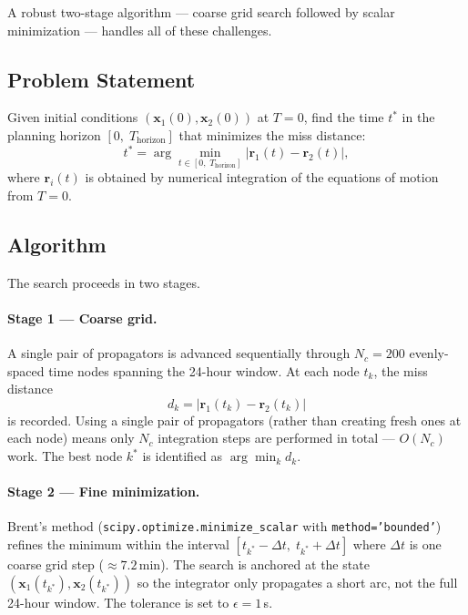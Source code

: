 \documentclass[11pt]{article}
\begin{document}
A robust two-stage algorithm — coarse grid search followed by scalar minimization
— handles all of these challenges.

\subsection{Problem Statement}

Given initial conditions $(\mathbf{x}_1(0), \mathbf{x}_2(0))$ at $T{=}0$,
find the time $t^*$ in the planning horizon $[0,\; T_\text{horizon}]$ that
minimizes the miss distance:
\begin{equation}
  t^* = \arg\min_{t \in [0,\;T_\text{horizon}]}
    \bigl|\mathbf{r}_1(t) - \mathbf{r}_2(t)\bigr|,
\end{equation}
where $\mathbf{r}_i(t)$ is obtained by numerical integration of the equations
of motion from $T{=}0$.

\subsection{Algorithm}

The search proceeds in two stages.

\paragraph{Stage 1 — Coarse grid.}
A single pair of propagators is advanced sequentially through $N_c = 200$
evenly-spaced time nodes spanning the 24-hour window.  At each node $t_k$,
the miss distance
\begin{equation}
  d_k = |\mathbf{r}_1(t_k) - \mathbf{r}_2(t_k)|
\end{equation}
is recorded.  Using a single pair of propagators (rather than creating fresh
ones at each node) means only $N_c$ integration steps are performed in total —
$O(N_c)$ work.  The best node $k^*$ is identified as $\arg\min_k d_k$.

\paragraph{Stage 2 — Fine minimization.}
Brent's method (\texttt{scipy.optimize.minimize\_scalar} with
\texttt{method='bounded'}) refines the minimum within the interval
$[t_{k^*} - \Delta t,\; t_{k^*} + \Delta t]$ where $\Delta t$ is one coarse
grid step ($\approx 7.2$\,min).  The search is anchored at the state
$({\mathbf{x}}_1(t_{k^*}), \mathbf{x}_2(t_{k^*}))$ so the integrator only
propagates a short arc, not the full 24-hour window.  The tolerance is set to
$\epsilon = 1$\,s.
\end{document}
